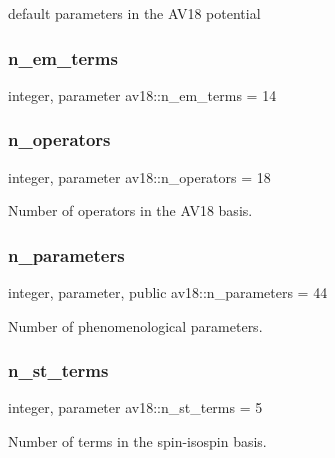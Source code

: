 default parameters in the A\+V18 potential 

\mbox{\label{namespaceav18_abdf1bd7208851f82a6773c558de0602f}} 
\subsubsection{\texorpdfstring{n\+\_\+em\+\_\+terms}{n\_em\_terms}}
{\footnotesize\ttfamily integer, parameter av18\+::n\+\_\+em\+\_\+terms = 14\hspace{0.3cm}{\ttfamily [private]}}

\mbox{\label{namespaceav18_a360396af16932b4172038bd146cb1e0a}} 
\subsubsection{\texorpdfstring{n\+\_\+operators}{n\_operators}}
{\footnotesize\ttfamily integer, parameter av18\+::n\+\_\+operators = 18\hspace{0.3cm}{\ttfamily [private]}}



Number of operators in the A\+V18 basis. 

\mbox{\label{namespaceav18_a227e50c056ed5f33a1de8f7536c2393b}} 
\subsubsection{\texorpdfstring{n\+\_\+parameters}{n\_parameters}}
{\footnotesize\ttfamily integer, parameter, public av18\+::n\+\_\+parameters = 44}



Number of phenomenological parameters. 

\mbox{\label{namespaceav18_ae95361ff4578323939542bc0807d127d}} 
\subsubsection{\texorpdfstring{n\+\_\+st\+\_\+terms}{n\_st\_terms}}
{\footnotesize\ttfamily integer, parameter av18\+::n\+\_\+st\+\_\+terms = 5\hspace{0.3cm}{\ttfamily [private]}}



Number of terms in the spin-\/isospin basis. 

